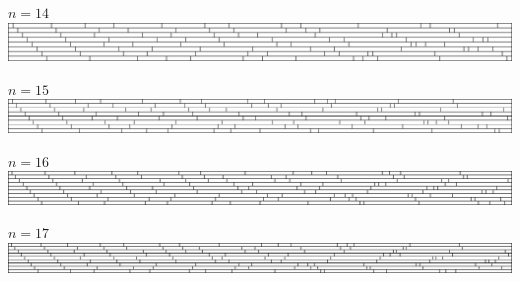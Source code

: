 $n = 14$\\
\includegraphics[width=\textwidth]{../solutions/14}
\par\vspace{1em}
$n = 15$\\
\includegraphics[width=\textwidth]{../solutions/15}
\par\vspace{1em}
$n = 16$\\
\includegraphics[width=\textwidth]{../solutions/16}
\par\vspace{1em}
$n = 17$\\
\includegraphics[width=\textwidth]{../solutions/17}
